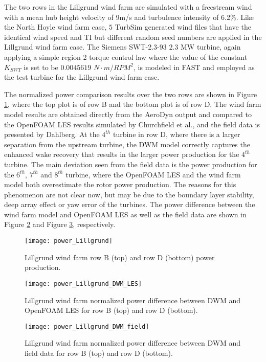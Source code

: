 \documentclass{umthesis}
\begin{document}
The two rows in the Lillgrund wind farm are simulated with a freestream wind with a mean hub height velocity of 9m/s and turbulence intensity of 6.2\%. Like the North Hoyle wind farm case, $5$ TurbSim generated wind files that have the identical wind speed and TI but different random seed numbers are applied in the Lillgrund wind farm case. The Siemens SWT-2.3-93 $2.3$ MW turbine, again applying a simple region 2 torque control law where the value of the constant $K_{SWT}$ is set to be $0.0045619$ $N\cdot m/RPM^2$, is modeled in FAST and employed as the test turbine for the Lillgrund wind farm case.

The normalized power comparison results over the two rows are shown in Figure \ref{fig:power_Lillgrund}, where the top plot is of row B and the bottom plot is of row D. The wind farm model results are obtained directly from the AeroDyn output and compared to the OpenFOAM LES results simulated by Churchfield et al., and the field data is presented by Dahlberg\cite{Churchfield_LES}. At the $4^{th}$ turbine in row D, where there is a larger separation from the upstream turbine, the DWM model correctly captures the enhanced wake recovery that results in the larger power production for the $4^{th}$ turbine. The main deviation seen from the field data is the power production for the $6^{th}$, $7^{th}$ and $8^{th}$ turbine, where the OpenFOAM LES and the wind farm model both overestimate the rotor power production. The reasons for this phenomenon are not clear now, but may be due to the boundary layer stability, deep array effect or yaw error of the turbines. The power difference between the wind farm model and OpenFOAM LES as well as the field data are shown in Figure \ref{fig:power_Lillgrund_DWM_LES} and Figure \ref{fig:power_Lillgrund_DWM_field}, respectively.
\begin{figure}
  \centering
  \texttt{[image: power\_Lillgrund]}
  \caption{Lillgrund wind farm row B (top) and row D (bottom) power production.}\label{fig:power_Lillgrund}
\end{figure}
\begin{figure}
  \centering
  \texttt{[image: power\_Lillgrund\_DWM\_LES]}
  \caption{Lillgrund wind farm normalized power difference between DWM and OpenFOAM LES for row B (top) and row D (bottom).}\label{fig:power_Lillgrund_DWM_LES}
\end{figure}
\begin{figure}
  \centering
  \texttt{[image: power\_Lillgrund\_DWM\_field]}
  \caption{ Lillgrund wind farm normalized power difference between DWM and field data for row B (top) and row D (bottom).}\label{fig:power_Lillgrund_DWM_field}
\end{figure}
\end{document}
